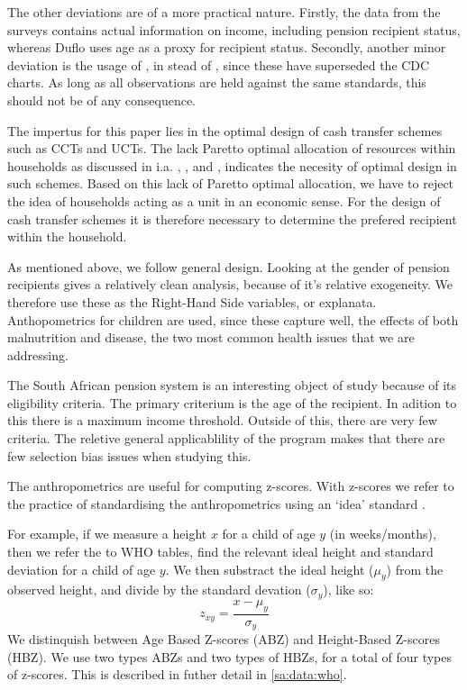 \begin{refsection}
The other deviations are of a more practical nature.
Firstly, the data from the \textcite{saldru2008nids,saldru2012nids} surveys contains actual information on income,
including pension recipient status, whereas Duflo uses age as a proxy for recipient status.
Secondly, another minor deviation is the usage of \textcite[WHO Child Growth Standards]{who2006child},
in stead of \textcite[CDC Growth Charts: United States]{nchs2000cdc}, since these have superseded the CDC charts.
As long as all observations are held against the same standards, this should not be of any consequence.

The impertus for this paper lies in the optimal design of cash transfer schemes such as CCTs and UCTs.
The lack Paretto optimal allocation of resources within households as discussed in i.a.
\textcite{udry1995gender}, \textcite{udry1996gender}, and \textcite{duflo2004intrahousehold},
indicates the necesity of optimal design in such schemes.
Based on this lack of Paretto optimal allocation,
we have to reject the idea of households acting as a unit in an economic sense.
For the design of cash transfer schemes it is therefore necessary to determine the prefered recipient within the household.

As mentioned above, we follow \textcite{duflo2000child,duflo2003grandmothers} general design.
Looking at the gender of pension recipients gives a relatively clean analysis,
because of it's relative exogeneity.
We therefore use these as the Right-Hand Side variables, or explanata.
Anthopometrics for children are used, since these capture well, the effects of both malnutrition and disease,
the two most common health issues that we are addressing.

The South African pension system is an interesting object of study because of its eligibility criteria.
The primary criterium is the age of the recipient.
In adition to this there is a maximum income threshold.
Outside of this, there are very few criteria.
The reletive general applicablility of the program makes that there are few selection bias issues when studying this.

The anthropometrics are useful for computing z-scores.
With z-scores we refer to the practice of standardising the anthropometrics using an `idea' standard \parencite{who2006child}.

For example, if we measure a height $x$ for a child of age $y$ (in weeks/months),
then we refer the to WHO tables, find the relevant ideal height and standard deviation for a child of age $y$.
We then substract the ideal height ($\mu_y$) from the observed height,
and divide by the standard devation ($\sigma_y$), like so:
\[
z_{xy} = \frac{x - \mu_y}{\sigma_{y}}
\]
We distinquish between Age Based Z-scores (ABZ) and Height-Based Z-scores (HBZ).
We use two types ABZs and two types of HBZs, for a total of four types of z-scores.
This is described in futher detail in \autoref{sa:data:who}.


\end{refsection}
